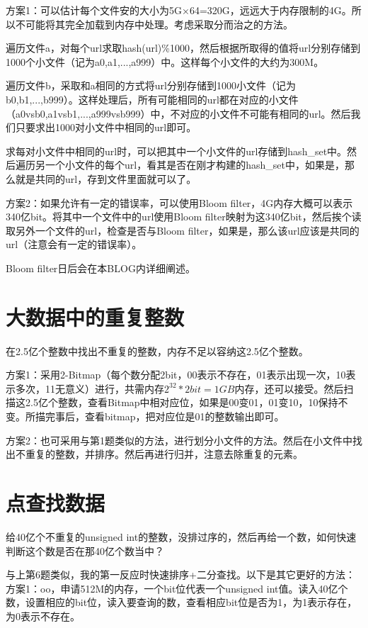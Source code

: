 方案1：可以估计每个文件安的大小为5G×64=320G，远远大于内存限制的4G。所以不可能将其完全加载到内存中处理。考虑采取分而治之的方法。

遍历文件a，对每个url求取hash(url)\%1000，然后根据所取得的值将url分别存储到1000个小文件（记为a0,a1,...,a999）中。这样每个小文件的大约为300M。

遍历文件b，采取和a相同的方式将url分别存储到1000小文件（记为b0,b1,...,b999）。这样处理后，所有可能相同的url都在对应的小文件（a0vsb0,a1vsb1,...,a999vsb999）中，不对应的小文件不可能有相同的url。然后我们只要求出1000对小文件中相同的url即可。

求每对小文件中相同的url时，可以把其中一个小文件的url存储到hash_set中。然后遍历另一个小文件的每个url，看其是否在刚才构建的hash_set中，如果是，那么就是共同的url，存到文件里面就可以了。

方案2：如果允许有一定的错误率，可以使用Bloom filter，4G内存大概可以表示340亿bit。将其中一个文件中的url使用Bloom filter映射为这340亿bit，然后挨个读取另外一个文件的url，检查是否与Bloom 
filter，如果是，那么该url应该是共同的url（注意会有一定的错误率）。

Bloom filter日后会在本BLOG内详细阐述。

\section{大数据中的重复整数}
在2.5亿个整数中找出不重复的整数，内存不足以容纳这2.5亿个整数。

方案1：采用2-Bitmap（每个数分配2bit，00表示不存在，01表示出现一次，10表示多次，11无意义）进行，共需内存$2^32 * 2 bit=1 
GB$内存，还可以接受。然后扫描这2.5亿个整数，查看Bitmap中相对应位，如果是00变01，01变10，10保持不变。所描完事后，查看bitmap，把对应位是01的整数输出即可。

方案2：也可采用与第1题类似的方法，进行划分小文件的方法。然后在小文件中找出不重复的整数，并排序。然后再进行归并，注意去除重复的元素。

\section{点查找数据}
给40亿个不重复的unsigned int的整数，没排过序的，然后再给一个数，如何快速判断这个数是否在那40亿个数当中？

与上第6题类似，我的第一反应时快速排序+二分查找。以下是其它更好的方法：
方案1：oo，申请512M的内存，一个bit位代表一个unsigned int值。读入40亿个数，设置相应的bit位，读入要查询的数，查看相应bit位是否为1，为1表示存在，为0表示不存在。

